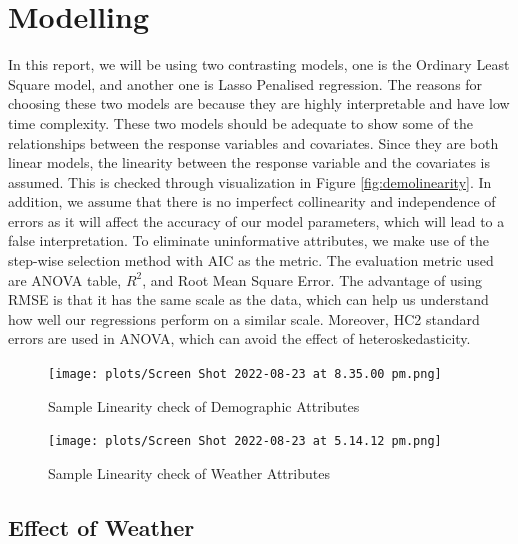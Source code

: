 \documentclass[11pt]{article}
\begin{document}
\section{Modelling}
In this report, we will be using two contrasting models, one is the Ordinary Least Square model, and another one is Lasso Penalised regression. The reasons for choosing these two models are because they are highly interpretable and have low time complexity. These two models should be adequate to show some of the relationships between the response variables and covariates. Since they are both linear models, the linearity between the response variable and the covariates is assumed. This is checked through visualization in Figure \ref{fig:demolinearity}. In addition, we assume that there is no imperfect collinearity and independence of errors as it will affect the accuracy of our model parameters, which will lead to a false interpretation. To eliminate uninformative attributes, we make use of the step-wise selection method with AIC as the metric. The evaluation metric used are ANOVA table, $R^2$, and Root Mean Square Error. The advantage of using RMSE is that it has the same scale as the data, which can help us understand how well our regressions perform on a similar scale. Moreover, HC2 standard errors are used in ANOVA, which can avoid the effect of heteroskedasticity.

\begin{figure}[h]
    \centering
    \begin{minipage}{0.45\textwidth}
        \centering
        \texttt{[image: plots/Screen Shot 2022-08-23 at 8.35.00 pm.png]}
        \caption{Sample Linearity check of Demographic Attributes}
        \label{fig:demolinearity}
    \end{minipage}\hfill
    \begin{minipage}{0.45\textwidth}
        \centering
        \texttt{[image: plots/Screen Shot 2022-08-23 at 5.14.12 pm.png]}
        \caption{Sample Linearity check of Weather Attributes}
        \label{fig:weatherlinearity}
    \end{minipage}
\end{figure}
\subsection{Effect of Weather}
\end{document}

